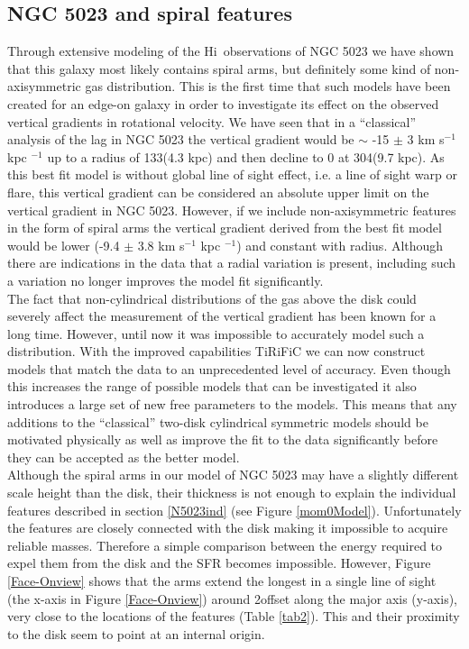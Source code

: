 \documentclass[useAMS,usenatbib]{mn2e}
\newcommand\HI{H{\sc i}}
\begin{document}
{ \subsection{NGC 5023 and spiral features}
Through extensive modeling of the \HI\ observations of NGC 5023 we have shown that this galaxy most likely contains spiral arms, but definitely some kind of non-axisymmetric gas distribution. This is the first time that such models have been created for  an edge-on galaxy in order to investigate its effect on the observed vertical gradients in rotational velocity. We have seen that in a ``classical'' analysis of the lag in NGC 5023 the vertical gradient would be  $\sim$ -15 $\pm$ 3  km s$^{-1}$ kpc $^{-1}$ up to a radius of 133\arcsec (4.3 kpc) and  then decline to 0 at 304\arcsec  (9.7 kpc). As this best fit model is without global line of sight effect, i.e. a line of sight warp or flare,  this vertical gradient can be considered an absolute upper limit on the vertical gradient in NGC 5023. However, if we include non-axisymmetric features in the form of spiral arms the vertical gradient derived from the best fit model would be lower  (-9.4 $\pm$ 3.8  km s$^{-1}$ kpc $^{-1}$) and constant with radius. Although there are indications in the data that a radial variation is present, including such a variation no longer improves the model fit significantly.\\ 
 \indent The fact that non-cylindrical distributions of the gas above the disk  could severely affect the measurement of the vertical gradient has been known for a long time. However, until now it was impossible to accurately model such a distribution. With the improved capabilities {\sc TiRiFiC} we can now construct models that match the data to an unprecedented level of accuracy. Even though this increases the range of possible models that can be investigated it also introduces a large set of new free parameters to the models. This means that any additions to the ``classical'' two-disk cylindrical symmetric models should be motivated physically as well as improve the fit to the data significantly before they can be accepted as the better model. \\
 \indent Although the spiral arms in our model of NGC 5023 may have a slightly different scale height than the disk, their thickness is not enough to explain the individual features described in section \ref{N5023ind} (see Figure \ref{mom0Model}). Unfortunately the features are closely connected with the disk making it impossible to acquire reliable masses. Therefore a simple comparison between the energy required to expel them from the disk and the SFR becomes impossible. However, Figure \ref{Face-Onview} shows that the arms extend the longest in a single line of sight (the x-axis in Figure \ref{Face-Onview}) around 2\arcmin offset along the major axis (y-axis), very close to the locations of the features (Table \ref{tab2}). This and their proximity to the disk seem to point at an internal origin.\\
}
\end{document}
